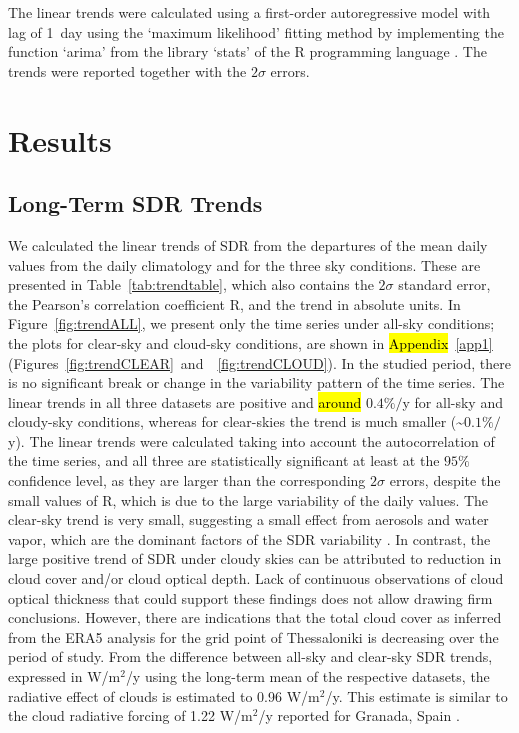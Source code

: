 \documentclass[applsci,article,accept,moreauthors,pdftex]{Definitions/mdpi}
\begin{document}
The linear trends were calculated using a first-order autoregressive
model with lag of 1~day using the `maximum likelihood' fitting method
\citep{Gardner1980, Jones1980} by implementing the function `arima'
from the library `stats' of the R programming language
\citep{RCT2023}. The trends were reported together with the \(2\sigma\)
errors.

\hypertarget{results}{%
\section{Results}\label{results}}

\hypertarget{long-term-sdr-trends}{%
\subsection{Long-Term SDR Trends}\label{long-term-sdr-trends}}

We calculated the linear trends of SDR from the departures of the mean
daily values from the daily climatology and for the three sky
conditions. These are presented in Table~\ref{tab:trendtable}, which also contains the \(2\sigma\) standard error, the Pearson's correlation
coefficient R, and the trend in absolute units. In
Figure~\ref{fig:trendALL}, we present only the time series under all-sky
conditions; the plots for clear-sky and cloud-sky conditions, are shown
in \mbox{\hl{Appendix} %
 \ref{app1}} \mbox{(Figures~\ref{fig:trendCLEAR} and~
\ref{fig:trendCLOUD}).} In the studied period, there is no significant
break or change in the variability pattern of the time series. The
linear trends in all three datasets are positive and \hl{around} %
\(0.4\%/\)y for all-sky and cloudy-sky conditions, whereas for
clear-skies the trend is much smaller (\textasciitilde{}\(0.1\%/\)y).
The linear trends were calculated taking into account the
autocorrelation of the time series, and all three are statistically
significant at least at the \(95\%\) confidence level, as they are
larger than the corresponding \(2\sigma\) errors, despite the small
values of R, which is due to the large variability of the daily values.
The clear-sky trend is very small, suggesting a small effect from
aerosols and water vapor, which are the dominant factors of the SDR
variability \citep{Fountoulakis2016, Siomos2018, Yu2022}. In contrast,
the large positive trend of SDR under cloudy skies can be attributed to
reduction in cloud cover and/or cloud optical depth. Lack of continuous
observations of cloud optical thickness that could support these
findings does not allow drawing firm conclusions. However, there are
indications that the total cloud cover as inferred from the ERA5
analysis for the grid point of Thessaloniki is decreasing over the
period of study. From the difference between all-sky and clear-sky SDR
trends, expressed in W/m$^2$/y using the long-term mean of the
respective datasets, the radiative effect of clouds is estimated to
0.96 W/m$^2$/y. This estimate is similar to the cloud radiative
forcing of 1.22 W/m$^2$/y  reported for Granada, Spain
\citep{Lozano2023}.
\end{document}
